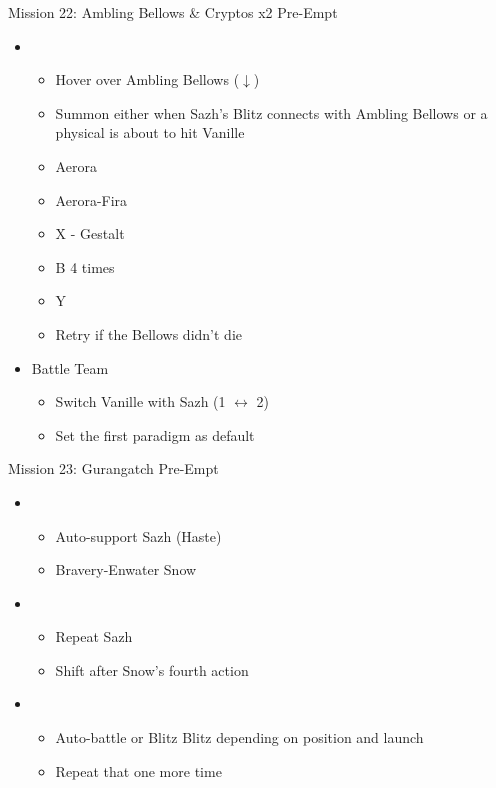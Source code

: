 \begin{multicols}{2}
\begin{battle}{Mission 22: Ambling Bellows \& Cryptos x2 Pre-Empt}
\begin{itemize}
    \item \sixth
    \begin{itemize}
        \item Hover over Ambling Bellows ($\downarrow$)
        \item Summon either when Sazh's Blitz connects with Ambling Bellows or a physical is about to hit Vanille
        \item Aerora
        \item Aerora-Fira
        \item X - Gestalt
        \item B 4 times
        \item Y
        \item Retry if the Bellows didn't die
    \end{itemize}
\end{itemize}
\end{battle}

\begin{menu}
\begin{itemize}
    \paradigm
    \begin{itemize}
        \item Battle Team
        \begin{itemize}
            \item Switch Vanille with Sazh (1 $\leftrightarrow$ 2)
            \item Set the first paradigm as default
        \end{itemize}
    \end{itemize}
\end{itemize}
\end{menu}
\begin{battle}{Mission 23: Gurangatch Pre-Empt}
\begin{itemize}
    \item \first
    \begin{itemize}
        \item Auto-support Sazh (Haste)
        \item Bravery-Enwater Snow
    \end{itemize}
    \item \fifth
    \begin{itemize}
        \item Repeat Sazh
        \item Shift after Snow's fourth action
    \end{itemize}
    \item \sixth
    \begin{itemize}
        \item Auto-battle or Blitz Blitz depending on position and launch
        \item Repeat that one more time
    \end{itemize}
\end{itemize}
\end{battle}


\end{multicols}

